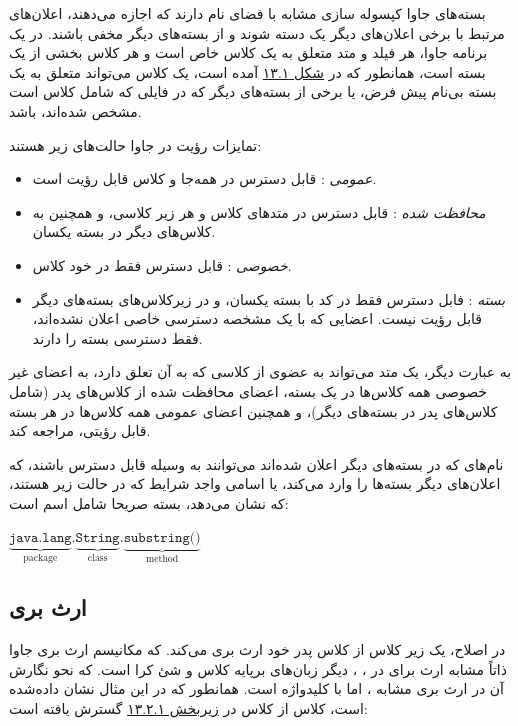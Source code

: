 \documentclass[a4paper,12pt]{report}
\newcommand{\lrm}[1]{\textcolor{steelBlue}{\lr{\texttt{#1}}}}
\begin{document}
	بسته‌های جاوا کپسوله سازی مشابه با فضای نام 
	دارند که اجازه می‌دهند، اعلان‌های مرتبط با برخی اعلان‌های دیگر یک دسته شوند و از بسته‌های دیگر مخفی باشند. 
در یک برنامه جاوا، هر فیلد و متد متعلق به یک کلاس خاص است و هر کلاس بخشی از یک بسته است، همانطور که در 
	\hyperref[fig1:subsec2:sec2:chap13]{
	شکل ۱۳.۱}
	\linebreak
 آمده است، یک کلاس می‌تواند متعلق به یک بسته بی‌نام پیش فرض،‌ یا برخی از بسته‌های دیگر که در فایلی که شامل کلاس است مشخص شده‌اند، باشد.

	تمایزات رؤیت
	 در جاوا حالت‌های زیر هستند:
\begin{itemize}[nosep]
	\renewcommand{\labelitemi}{\color{gray}\scriptsize$\blacksquare$}
	\item
	\textit{
	عمومی
}: قابل دسترس در همه‌جا و کلاس قابل رؤیت است.
	\item\textit{
	محافظت شده
}: قابل دسترس در متد‌های کلاس و هر زیر کلاسی، و همچنین به کلاس‌های دیگر در بسته یکسان. 
	\item\textit{
	خصوصی
}: قابل دسترس فقط در خود کلاس.
	\item\textit{
		بسته
}: فابل دسترس فقط در کد با بسته یکسان، و در زیرکلاس‌های بسته‌های دیگر قابل رؤیت نیست. اعضایی که با یک مشخصه دسترسی خاصی اعلان نشده‌اند، فقط دسترسی بسته را دارند.
\end{itemize}

	به عبارت دیگر، یک متد می‌تواند به عضوی از کلاسی که به آن تعلق دارد، به اعضای غیر خصوصی همه کلاس‌ها در یک بسته، اعضای محافظت شده از کلاس‌های پدر (شامل کلاس‌های پدر در بسته‌های دیگر)، و همچنین اعضای عمومی همه کلاس‌ها در هر بسته قابل رؤیتی، مراجعه کند.
	
	نام‌های که در بسته‌های دیگر اعلان شده‌اند می‌توانند به وسیله 
	\lrm{import}
	قابل دسترس باشند، که اعلان‌های دیگر بسته‌ها را وارد می‌کند، یا اسامی واجد شرایط که در حالت زیر هستند، که  نشان می‌دهد، بسته صریحا شامل اسم است:  

\begin{latin}
	\color{steelBlue}
	$\underbrace{\texttt{java.lang}}_{\text{package}}.
	\underbrace{\texttt{String}}_{\text{class}}.
	\underbrace{\texttt{substring()}}_{\text{method}}$
\end{latin}

\subsection{
	ارث بری}
\label{subsec3:sec2:chap13}
	در اصلاح، یک زیر کلاس از کلاس پدر خود ارث ‌بری می‌کند. که مکانیسم ارث بری جاوا ذاتاً مشابه ارث برای در 
	، 
	، دیگر زبان‌های برپایه کلاس و شئ کرا است. که نحو نگارش آن در ارث بری مشابه 
	، اما با کلیدواژه 
	\lrm{extends}
	است. همانطور که در این مثال نشان داده‌شده است، کلاس 
	\lrm{ColorPoint}
	از کلاس 
	\lrm{Point}
	در 
	\hyperref[subsec1:sec2:chap13]{
	زیربخش ۱۳.۲.۱} گسترش یافته است:
\end{document}

